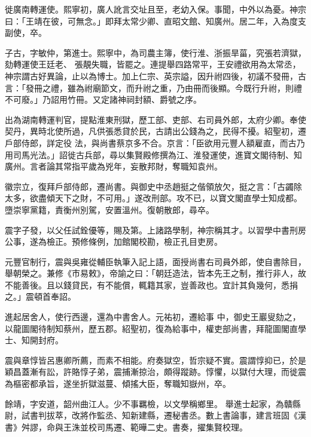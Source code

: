 \begin{pinyinscope}
 徙廣南轉運使。熙寧初，廣人訛言交址且至，老幼入保。事聞，中外以為憂。神宗曰：「王靖在彼，可無念。」即拜太常少卿、直昭文館、知廣州。居二年，入為度支副使，卒。



 子古，字敏仲，第進士。熙寧中，為司農主簿，使行淮、浙振旱菑，究張若濟獄，劾轉運使王廷老、
 張靚失職，皆罷之。連提舉四路常平，王安禮欲用為太常丞，神宗謂古好異論，止以為博士。加上仁宗、英宗謚，因升祔四後，初議不發冊，古言：「發冊之禮，雖為祔廟節文，而升祔之重，乃由冊而後顯。今既行升祔，則禮不可廢。」乃詔用竹冊。又定諸神祠封額、爵號之序。



 出為湖南轉運判官，提點淮東刑獄，歷工部、吏部、右司員外郎，太府少卿。奉使契丹，異時北使所過，凡供張悉貸於民，古請出公錢為之，民得不擾。紹聖初，遷戶部侍郎，詳定役
 法，與尚書蔡京多不合。京言：「臣欲用元豐人額雇直，而古乃用司馬光法。」詔徙古兵部，尋以集賢殿修撰為江、淮發運使，進寶文閣待制、知廣州。言者論其常指平歲為兇年，妄散邦財，奪職知袁州。



 徽宗立，復拜戶部侍郎，遷尚書。與御史中丞趙挺之偕領放欠，挺之言：「古蠲除太多，欲盡傾天下之財，不可用。」遂改刑部。攻不已，以寶文閣直學士知成都。墮崇寧黨籍，責衡州別駕，安置溫州。復朝散郎，尋卒。



 震字子發，以父任試銓優等，賜及第。上諸路學制，神宗稱其才。以習學中書刑房公事，遂為檢正。預修條例，加館閣校勘，檢正孔目吏房。



 元豐官制行，震與吳雍從輔臣執筆入記上語，面授尚書右司員外郎，使自書除目，舉朝榮之。兼修《市易敕》，帝諭之曰：「朝廷造法，皆本先王之制，推行非人，故不能善後。且以錢貸民，有不能償，輒籍其家，豈善政也。宜計其負幾何，悉捐之。」震頓首奉詔。



 進起居舍人，使行西邊，還為中書舍人。元祐初，遷給事
 中，御史王巖叟劾之，以龍圖閣待制知蔡州，歷五郡。紹聖初，復為給事中，權吏部尚書，拜龍圖閣直學士、知開封府。



 震與章惇皆呂惠卿所薦，而素不相能。府奏獄空，哲宗疑不實。震謂惇抑已，於是穎昌蓋漸有訟，許賂惇子弟，震捕漸掠治，頗得蹤跡。惇懼，以獄付大理，而徙震為樞密都承旨，遂坐折獄滋蔓、傾搖大臣，奪職知嶽州，卒。



 餘靖，字安道，韶州曲江人。少不事羈檢，以文學稱鄉里。
 舉進士起家，為贛縣尉，試書判拔萃，改將作監丞、知新建縣，遷秘書丞。數上書論事，建言班固《漢書》舛謬，命與王洙並校司馬遷、範曄二史。書奏，擢集賢校理。




\end{pinyinscope}
